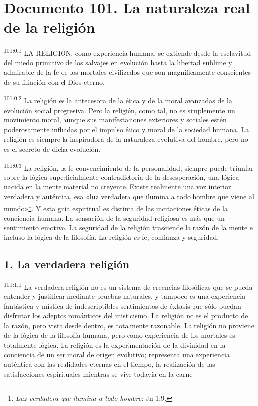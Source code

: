 \chapter{Documento 101. La naturaleza real de la religión}
\par
\textsuperscript{101:0.1} LA RELIGIÓN, como experiencia humana, se extiende desde la esclavitud del miedo primitivo de los salvajes en evolución hasta la libertad sublime y admirable de la fe de los mortales civilizados que son magníficamente conscientes de su filiación con el Dios eterno.

\par
\textsuperscript{101:0.2} La religión es la antecesora de la ética y de la moral avanzadas de la evolución social progresiva. Pero la religión, como tal, no es simplemente un movimiento moral, aunque sus manifestaciones exteriores y sociales estén poderosamente influidas por el impulso ético y moral de la sociedad humana. La religión es siempre la inspiradora de la naturaleza evolutiva del hombre, pero no es el secreto de dicha evolución.

\par
\textsuperscript{101:0.3} La religión, la fe-convencimiento de la personalidad, siempre puede triunfar sobre la lógica superficialmente contradictoria de la desesperación, una lógica nacida en la mente material no creyente. Existe realmente una voz interior verdadera y auténtica, esa «luz verdadera que ilumina a todo hombre que viene al mundo»\footnote{\textit{Luz verdadera que ilumina a todo hombre}: Jn 1:9.}. Y esta guía espiritual es distinta de las incitaciones éticas de la conciencia humana. La sensación de la seguridad religiosa es más que un sentimiento emotivo. La seguridad de la religión trasciende la razón de la mente e incluso la lógica de la filosofía. La religión \textit{es} fe, confianza y seguridad.

\section*{1. La verdadera religión}
\par
\textsuperscript{101:1.1} La verdadera religión no es un sistema de creencias filosóficas que se pueda entender y justificar mediante pruebas naturales, y tampoco es una experiencia fantástica y mística de indescriptibles sentimientos de éxtasis que sólo puedan disfrutar los adeptos románticos del misticismo. La religión no es el producto de la razón, pero vista desde dentro, es totalmente razonable. La religión no proviene de la lógica de la filosofía humana, pero como experiencia de los mortales es totalmente lógica. La religión es la experimentación de la divinidad en la conciencia de un ser moral de origen evolutivo; representa una experiencia auténtica con las realidades eternas en el tiempo, la realización de las satisfacciones espirituales mientras se vive todavía en la carne.

